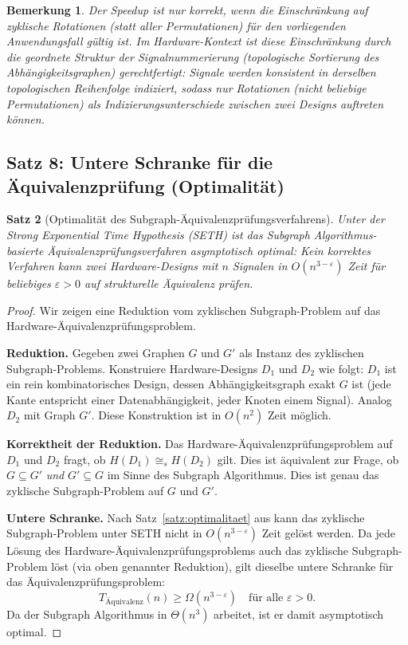﻿\documentclass[12pt,a4paper]{report}
\newtheorem{theorem}{Satz}[section]
\newtheorem{bemerkung}[theorem]{Bemerkung}
\begin{document}
\begin{bemerkung}
Der Speedup ist nur korrekt, wenn die Einschränkung auf zyklische Rotationen (statt aller Permutationen) für den vorliegenden Anwendungsfall gültig ist. Im Hardware-Kontext ist diese Einschränkung durch die geordnete Struktur der Signalnummerierung (topologische Sortierung des Abhängigkeitsgraphen) gerechtfertigt: Signale werden konsistent in derselben topologischen Reihenfolge indiziert, sodass nur Rotationen (nicht beliebige Permutationen) als Indizierungsunterschiede zwischen zwei Designs auftreten können.
\end{bemerkung}

\subsection{Satz 8: Untere Schranke für die Äquivalenzprüfung (Optimalität)}

\begin{theorem}[Optimalität des Subgraph-Äquivalenzprüfungsverfahrens]
\label{thm:optimalitaet_aequivalenz}
Unter der Strong Exponential Time Hypothesis (SETH) ist das Subgraph Algorithmus-basierte Äquivalenz\-prüfungsverfahren asymptotisch \emph{optimal}: Kein korrektes Verfahren kann zwei Hardware-Designs mit $n$ Signalen in $O(n^{3-\varepsilon})$ Zeit für beliebiges $\varepsilon > 0$ auf strukturelle Äquivalenz prüfen.
\end{theorem}

\begin{proof}
Wir zeigen eine Reduktion vom zyklischen Subgraph-Problem auf das Hardware-Äquivalenzprüfungsproblem.

\textbf{Reduktion.} Gegeben zwei Graphen $G$ und $G'$ als Instanz des zyklischen Subgraph-Problems. Konstruiere Hardware-Designs $D_1$ und $D_2$ wie folgt: $D_1$ ist ein rein kombinatorisches Design, dessen Abhängigkeitsgraph exakt $G$ ist (jede Kante entspricht einer Datenabhängigkeit, jeder Knoten einem Signal). Analog $D_2$ mit Graph $G'$. Diese Konstruktion ist in $O(n^2)$ Zeit möglich.

\textbf{Korrektheit der Reduktion.} Das Hardware-Äquivalenzprüfungsproblem auf $D_1$ und $D_2$ fragt, ob $H(D_1) \cong_s H(D_2)$ gilt. Dies ist äquivalent zur Frage, ob $G \subseteq G'$ \emph{und} $G' \subseteq G$ im Sinne des Subgraph Algorithmus. Dies ist genau das zyklische Subgraph-Problem auf $G$ und $G'$.

\textbf{Untere Schranke.} Nach Satz~\ref{satz:optimalitaet} aus \cite{subgraph2026} kann das zyklische Subgraph-Problem unter SETH nicht in $O(n^{3-\varepsilon})$ Zeit gelöst werden. Da jede Lösung des Hardware-Äquivalenzprü\-fungsproblems auch das zyklische Subgraph-Problem löst (via oben genannter Reduktion), gilt dieselbe untere Schranke für das Äquivalenzprüfungsproblem:
\[
T_{\text{Äquivalenz}}(n) \geq \Omega(n^{3-\varepsilon}) \quad \text{für alle } \varepsilon > 0.
\]
Da der Subgraph Algorithmus in $\Theta(n^3)$ arbeitet, ist er damit asymptotisch optimal.
\end{proof}
\end{document}
